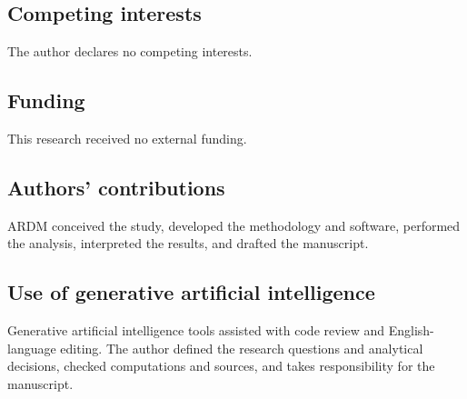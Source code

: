 \documentclass[11pt]{article}
\begin{document}
\subsection*{Competing interests}
The author declares no competing interests.

\subsection*{Funding}
This research received no external funding.

\subsection*{Authors' contributions}
ARDM conceived the study, developed the methodology and software, performed the analysis, interpreted the results, and drafted the manuscript.

\subsection*{Use of generative artificial intelligence}
Generative artificial intelligence tools assisted with code review and English-language editing. The author defined the research questions and analytical decisions, checked computations and sources, and takes responsibility for the manuscript.



\end{document}
